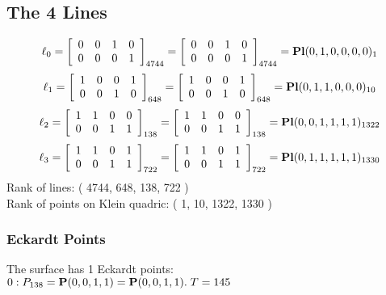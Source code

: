 \documentclass{article}
\newcommand{\bP}{{\bf P}}
\begin{document}
{\subsection*{The 4 Lines}
$$
\ell_{0} = 
\left[
\begin{array}{*{4}{r}}
0 & 0 & 1 & 0\\
0 & 0 & 0 & 1\\
\end{array}
\right]
_{4744}
=
\left[
\begin{array}{*{4}c}
0  & 0  & 1  & 0\\
0  & 0  & 0  & 1\\
\end{array}
\right]_{4744}
={\rm\bf Pl}(0,1,0,0,0,0 )_{1}$$
$$
\ell_{1} = 
\left[
\begin{array}{*{4}{r}}
1 & 0 & 0 & 1\\
0 & 0 & 1 & 0\\
\end{array}
\right]
_{648}
=
\left[
\begin{array}{*{4}c}
1  & 0  & 0  & 1\\
0  & 0  & 1  & 0\\
\end{array}
\right]_{648}
={\rm\bf Pl}(0,1,1,0,0,0 )_{10}$$
$$
\ell_{2} = 
\left[
\begin{array}{*{4}{r}}
1 & 1 & 0 & 0\\
0 & 0 & 1 & 1\\
\end{array}
\right]
_{138}
=
\left[
\begin{array}{*{4}c}
1  & 1  & 0  & 0\\
0  & 0  & 1  & 1\\
\end{array}
\right]_{138}
={\rm\bf Pl}(0,0,1,1,1,1 )_{1322}$$
$$
\ell_{3} = 
\left[
\begin{array}{*{4}{r}}
1 & 1 & 0 & 1\\
0 & 0 & 1 & 1\\
\end{array}
\right]
_{722}
=
\left[
\begin{array}{*{4}c}
1  & 1  & 0  & 1\\
0  & 0  & 1  & 1\\
\end{array}
\right]_{722}
={\rm\bf Pl}(0,1,1,1,1,1 )_{1330}$$
Rank of lines: ( 4744, 648, 138, 722 )\\
Rank of points on Klein quadric: ( 1, 10, 1322, 1330 )\\
\subsubsection*{Eckardt Points}
The surface has 1 Eckardt points:\\
$0 : P_{138}=\bP(0, 0, 1, 1) = \bP(0, 0, 1, 1).\; T= 145$\\
}
\end{document}
